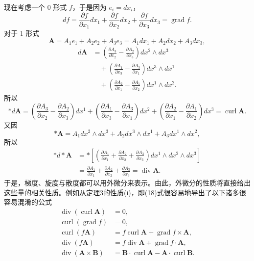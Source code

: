 现在考虑一个 $0$ 形式 $f$，于是因为 $e_i=dx_i$，
\begin{equation}
 df=\frac{\partial f}{\partial x_1}dx_1+\frac{\partial f}{\partial x_2}dx_2+\frac{\partial f}{\partial x_3}dx_3=\operatorname{grad}f.
 \tag{28}
\end{equation}
对于 $1$ 形式
\[
 \mathbf A=A_1e_1+A_2e_2+A_3e_3=A_1dx_1+A_2dx_2+A_3dx_3,
\]
\[
\begin{aligned}
 d\mathbf A
 &=\left(\frac{\partial A_3}{\partial x_2}-\frac{\partial A_2}{\partial x_3}\right)dx^2\wedge dx^3\\
 &\quad+\left(\frac{\partial A_1}{\partial x_3}-\frac{\partial A_3}{\partial x_1}\right)dx^3\wedge dx^1\\
 &\quad+\left(\frac{\partial A_2}{\partial x_1}-\frac{\partial A_1}{\partial x_2}\right)dx^1\wedge dx^2.
\end{aligned}
\]
所以
\begin{equation}
 *d\mathbf A
 =\left(\frac{\partial A_3}{\partial x_2}-\frac{\partial A_2}{\partial x_3}\right)dx^1
 +\left(\frac{\partial A_1}{\partial x_3}-\frac{\partial A_3}{\partial x_1}\right)dx^2
 +\left(\frac{\partial A_2}{\partial x_1}-\frac{\partial A_1}{\partial x_2}\right)dx^3
 =\operatorname{curl}\mathbf A.
 \tag{29}
\end{equation}
又因
\[
 *\mathbf A=A_1dx^2\wedge dx^3+A_2dx^3\wedge dx^1+A_3dx^1\wedge dx^2,
\]
所以
\begin{equation}
\begin{aligned}
 *d*\mathbf A
 &=*\left[\left(\frac{\partial A_1}{\partial x_1}+\frac{\partial A_2}{\partial x_2}+\frac{\partial A_3}{\partial x_3}\right)
 dx^1\wedge dx^2\wedge dx^3\right]\\
 &=\frac{\partial A_1}{\partial x_1}+\frac{\partial A_2}{\partial x_2}+\frac{\partial A_3}{\partial x_3}
 =\operatorname{div}\mathbf A.
\end{aligned}
 \tag{30}
\end{equation}
于是，梯度、旋度与散度都可以用外微分来表示。由此，外微分的性质将直接给出这些量的相关性质。例如从定理3的性质(i)，即(18)式很容易地导出了以下诸多很容易混淆的公式
\begin{align}
 \operatorname{div}(\operatorname{curl}\mathbf A)&=0, \tag{31}\\
 \operatorname{curl}(\operatorname{grad}f)&=0, \tag{32}\\
 \operatorname{curl}(f\mathbf A)&=f\operatorname{curl}\mathbf A+\operatorname{grad}f\times\mathbf A, \tag{33}\\
 \operatorname{div}(f\mathbf A)&=f\operatorname{div}\mathbf A+\operatorname{grad}f\cdot\mathbf A, \tag{34}\\
 \operatorname{div}(\mathbf A\times\mathbf B)&=\mathbf B\cdot\operatorname{curl}\mathbf A-\mathbf A\cdot\operatorname{curl}\mathbf B. \tag{35}
\end{align}

